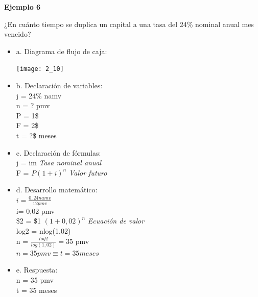 \textbf{Ejemplo 6}

¿En cuánto tiempo se duplica un capital a una tasa del 24\% nominal anual mes vencido?\\

\begin{itemize}
	\item a. Diagrama de flujo de caja:\\
	\begin{center}
		\texttt{[image: 2\_10]}\\
	\end{center}
	\item b. Declaración de variables:\\
	
	j = 24\% namv\\ %
	n = ? pmv\\
	P = 1\$\\
	F = 2\$\\
	t = ?\$ meses\\
	
	\item c. Declaración de fórmulas:\\
	
	j = im \hspace{35 pt} \textit{Tasa nominal anual}\\
	
	F = $ P(1 + i)^n$ \hspace{35 pt} \textit{Valor futuro}\\
	
	\item d. Desarrollo matemático:\\
	
	$i= \frac{0,24 namv}{12 pmv}$\\

	i= 0,02 pmv\\
	
	\$2 = \$1 $(1+0,02)^n$ \hspace{35 pt} \textit{Ecuación de valor}\\
	log2 = nlog(1,02)\\
	
	n = $\frac{log2}{log(1,02)} = 35$ pmv\\
	
	$n = 35 pmv \equiv t=35 meses$\\
	
	
	\item e. Respuesta:\\
	
	n = 35 pmv\\
	t = 35 meses\\
	
\end{itemize}

